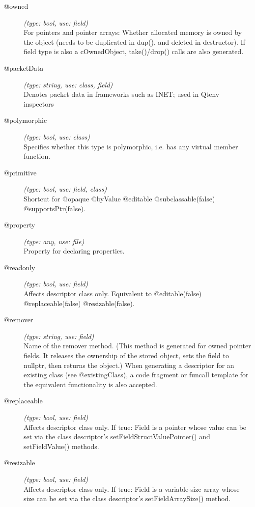 \begin{description}
\item[@owned] \textit{(type: bool, use: field)} \\
  For pointers and pointer arrays: Whether allocated memory is owned by the
  object (needs to be duplicated in dup(), and deleted in destructor). If
  field type is also a cOwnedObject, take()/drop() calls are also generated.

\item[@packetData] \textit{(type: string, use: class, field)} \\
  Denotes packet data in frameworks such as INET; used in Qtenv inspectors

\item[@polymorphic] \textit{(type: bool, use: class)} \\
  Specifies whether this type is polymorphic, i.e. has any virtual member
  function.

\item[@primitive] \textit{(type: bool, use: field, class)} \\
  Shortcut for @opaque @byValue @editable @subclassable(false)
  @supportsPtr(false).

\item[@property] \textit{(type: any, use: file)} \\
  Property for declaring properties.

\item[@readonly] \textit{(type: bool, use: field)} \\
  Affects descriptor class only. Equivalent to @editable(false)
  @replaceable(false) @resizable(false).

\item[@remover] \textit{(type: string, use: field)} \\
  Name of the remover method. (This method is generated for owned pointer
  fields. It releases the ownership of the stored object, sets the field to
  nullptr, then returns the object.) When generating a descriptor for an
  existing class (see @existingClass), a code fragment or funcall template for
  the equivalent functionality is also accepted.

\item[@replaceable] \textit{(type: bool, use: field)} \\
  Affects descriptor class only. If true: Field is a pointer whose value can
  be set via the class descriptor's setFieldStructValuePointer() and
  setFieldValue() methods.

\item[@resizable] \textit{(type: bool, use: field)} \\
  Affects descriptor class only. If true: Field is a variable-size array whose
  size can be set via the class descriptor's setFieldArraySize() method.


\end{description}
